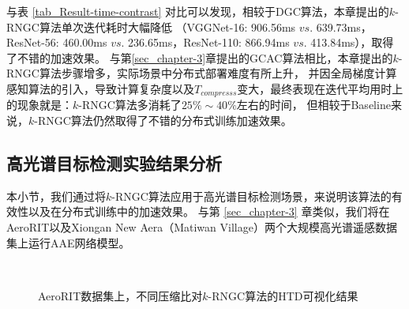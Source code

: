 \documentclass{xdupgthesis}
\begin{document}
与表 \ref*{tab_Result-time-contrast} 对比可以发现，相较于DGC算法，本章提出的$k$-RNGC算法单次迭代耗时大幅降低
（VGGNet-16: 906.56ms $vs.$ 639.73ms，ResNet-56: 460.00ms $vs.$ 236.65ms，ResNet-110: 866.94ms $vs.$ 413.84ms），取得了不错的加速效果。
与第\ref{sec_chapter-3}章提出的GCAC算法相比，本章提出的$k$-RNGC算法步骤增多，实际场景中分布式部署难度有所上升，
并因全局梯度计算感知算法的引入，导致计算复杂度以及$T_{compresss}$变大，最终表现在迭代平均用时上的现象就是：$k$-RNGC算法多消耗了$25\%\sim  40\%$左右的时间，
但相较于Baseline来说，$k$-RNGC算法仍然取得了不错的分布式训练加速效果。


\subsection{高光谱目标检测实验结果分析}
本小节，我们通过将$k$-RNGC算法应用于高光谱目标检测场景，来说明该算法的有效性以及在分布式训练中的加速效果。
与第 \ref*{sec_chapter-3} 章类似，我们将在AeroRIT以及Xiongan New Aera（Matiwan Village）两个大规模高光谱遥感数据集上运行AAE网络模型。

\begin{figure}[ht]
    \centering
     \\
    \caption{AeroRIT数据集上，不同压缩比对$k$-RNGC算法的HTD可视化结果}
    \label{fig_Result-AeroRIT-chapter4}
\end{figure}
\end{document}
